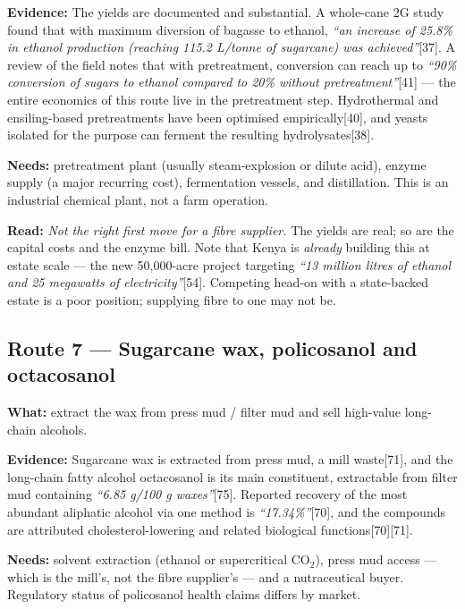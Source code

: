 \documentclass[11pt]{article}
\newcommand{\src}[1]{[#1]}
\begin{document}
\textbf{Evidence:} The yields are documented and substantial. A whole-cane 2G
study found that with maximum diversion of bagasse to ethanol, \emph{``an
increase of 25.8\% in ethanol production (reaching 115.2 L/tonne of
sugarcane) was achieved''}\src{37}. A review of the field notes that with
pretreatment, conversion can reach up to \emph{``90\% conversion of sugars to
ethanol compared to 20\% without pretreatment''}\src{41} --- the entire
economics of this route live in the pretreatment step. Hydrothermal and
ensiling-based pretreatments have been optimised empirically\src{40}, and
yeasts isolated for the purpose can ferment the resulting hydrolysates\src{38}.

\textbf{Needs:} pretreatment plant (usually steam-explosion or dilute acid),
enzyme supply (a major recurring cost), fermentation vessels, and
distillation. This is an industrial chemical plant, not a farm operation.

\textbf{Read:} \emph{Not the right first move for a fibre supplier.} The yields
are real; so are the capital costs and the enzyme bill. Note that Kenya is
\emph{already} building this at estate scale --- the new 50{,}000-acre project
targeting \emph{``13 million litres of ethanol and 25 megawatts of
electricity''}\src{54}. Competing head-on with a state-backed estate is a poor
position; supplying fibre to one may not be.

\subsection{Route 7 --- Sugarcane wax, policosanol and octacosanol}

\textbf{What:} extract the wax from press mud / filter mud and sell high-value
long-chain alcohols.

\textbf{Evidence:} Sugarcane wax is extracted from press mud, a mill
waste\src{71}, and the long-chain fatty alcohol octacosanol is its main
constituent, extractable from filter mud containing \emph{``6.85 g/100 g
waxes''}\src{75}. Reported recovery of the most abundant aliphatic alcohol via
one method is \emph{``17.34\%''}\src{70}, and the compounds are attributed
cholesterol-lowering and related biological functions\src{70}\src{71}.

\textbf{Needs:} solvent extraction (ethanol or supercritical CO$_2$), press mud
access --- which is the mill's, not the fibre supplier's --- and a nutraceutical
buyer. Regulatory status of policosanol health claims differs by market.
\end{document}
